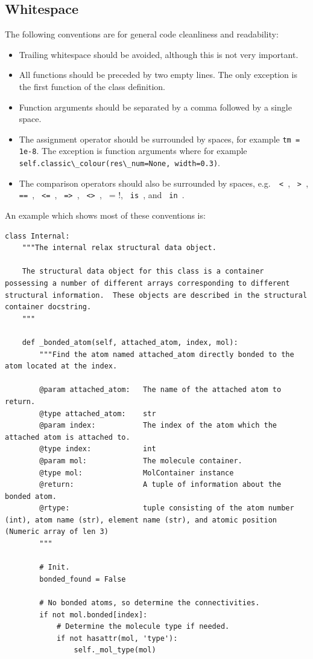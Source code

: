 \subsection{Whitespace}

The following conventions are for general code cleanliness and readability:
\begin{itemize}
  \item Trailing whitespace should be avoided, although this is not very important.
  \item All functions should be preceded by two empty lines.
    The only exception is the first function of the class definition.
  \item Function arguments should be separated by a comma followed by a single space.
  \item The assignment operator should be surrounded by spaces, for example \verb*!tm = 1e-8!.
    The exception is function arguments where for example \verb*!self.classic\_colour(res\_num=None, width=0.3)!.
  \item The comparison operators should also be surrounded by spaces, e.g.\ \verb*! < !, \verb*! > !, \verb*! == !, \verb*! <= !, \verb*! => !, \verb*! <> !, \verb*! != !, \verb*! is !, and \verb*! in !.
\end{itemize}

An example which shows most of these conventions is:
\begin{lstlisting}
class Internal:
    """The internal relax structural data object.

    The structural data object for this class is a container possessing a number of different arrays corresponding to different structural information.  These objects are described in the structural container docstring.
    """

    def _bonded_atom(self, attached_atom, index, mol):
        """Find the atom named attached_atom directly bonded to the atom located at the index.

        @param attached_atom:   The name of the attached atom to return.
        @type attached_atom:    str
        @param index:           The index of the atom which the attached atom is attached to.
        @type index:            int
        @param mol:             The molecule container.
        @type mol:              MolContainer instance
        @return:                A tuple of information about the bonded atom.
        @rtype:                 tuple consisting of the atom number (int), atom name (str), element name (str), and atomic position (Numeric array of len 3)
        """

        # Init.
        bonded_found = False

        # No bonded atoms, so determine the connectivities.
        if not mol.bonded[index]:
            # Determine the molecule type if needed.
            if not hasattr(mol, 'type'):
                self._mol_type(mol)
\end{lstlisting}



